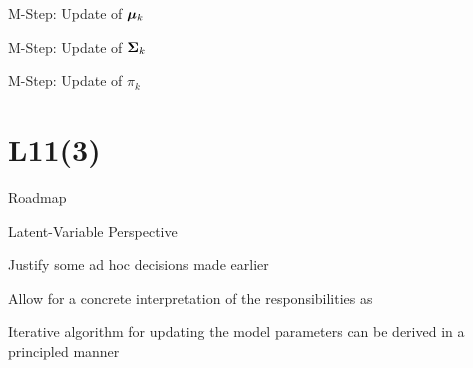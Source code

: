 \documentclass[handout,fleqn,aspectratio=169]{beamer}
\begin{document}
\begin{frame}{M-Step: Update of $\bm{\mu}_k$}

\plitemsep 0.07in
\bci
\item 
\eci
\end{frame}

\begin{frame}{M-Step: Update of $\bm{\Sigma}_k$}

\plitemsep 0.07in
\bci
\item 
\eci
\end{frame}
\begin{frame}{M-Step: Update of $\pi_k$}

\plitemsep 0.07in
\bci
\item 
\eci
\end{frame}

\section{L11(3)}
\begin{frame}{Roadmap}

\plitemsep 0.1in

\bce[(1)] 

\item {}
\item {}
\item {}
\item {}
\ece
\end{frame}


\begin{frame}{Latent-Variable Perspective}

\plitemsep 0.07in
\bci
\item Justify some ad hoc decisions made earlier
\item Allow for a concrete interpretation of the responsibilities as 
\item Iterative algorithm for updating the model parameters can be derived in a principled manner
\eci
\vspace{-0.9cm}

\end{frame}
\end{document}
